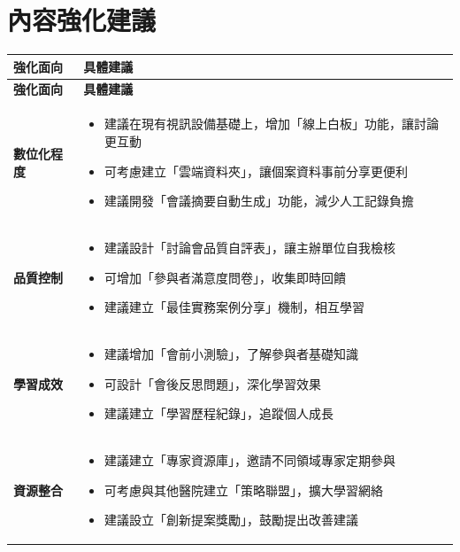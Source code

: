 \documentclass{article}
\begin{document}
\vspace{1cm}

\section*{內容強化建議}

\begin{longtable}{|>{\centering\arraybackslash}p{3cm}|>{\raggedright\arraybackslash}p{11cm}|}
\hline
\rowcolor{lightgray}
\textbf{強化面向} & \textbf{具體建議} \\
\hline
\endfirsthead

\hline
\rowcolor{lightgray}
\textbf{強化面向} & \textbf{具體建議} \\
\hline
\endhead

\hline
\endfoot

\hline
\endlastfoot

\textbf{數位化程度} & 
\begin{itemize}
    \item 建議在現有視訊設備基礎上，增加「線上白板」功能，讓討論更互動
    \item 可考慮建立「雲端資料夾」，讓個案資料事前分享更便利
    \item 建議開發「會議摘要自動生成」功能，減少人工記錄負擔
\end{itemize} \\
\hline

\textbf{品質控制} & 
\begin{itemize}
    \item 建議設計「討論會品質自評表」，讓主辦單位自我檢核
    \item 可增加「參與者滿意度問卷」，收集即時回饋
    \item 建議建立「最佳實務案例分享」機制，相互學習
\end{itemize} \\
\hline

\textbf{學習成效} & 
\begin{itemize}
    \item 建議增加「會前小測驗」，了解參與者基礎知識
    \item 可設計「會後反思問題」，深化學習效果
    \item 建議建立「學習歷程紀錄」，追蹤個人成長
\end{itemize} \\
\hline

\textbf{資源整合} & 
\begin{itemize}
    \item 建議建立「專家資源庫」，邀請不同領域專家定期參與
    \item 可考慮與其他醫院建立「策略聯盟」，擴大學習網絡
    \item 建議設立「創新提案獎勵」，鼓勵提出改善建議
\end{itemize} \\
\hline


\end{longtable}
\end{document}
